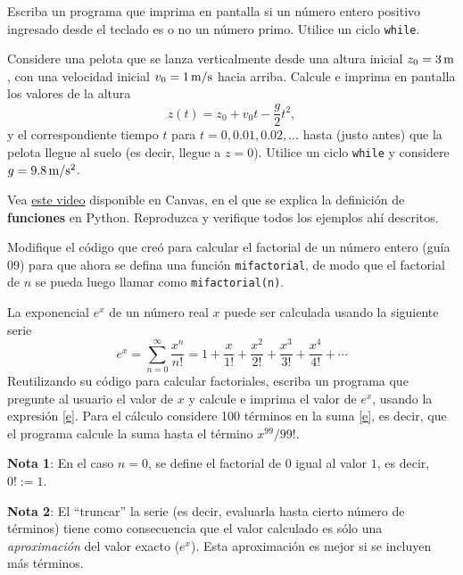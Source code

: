 \documentclass[11pt]{exam}
\begin{document}
\begin{questions}
\item Escriba un programa que imprima en pantalla si un número entero positivo ingresado desde el teclado es o no un número primo. Utilice un ciclo \texttt{while}.

\item Considere una pelota que se lanza verticalmente desde una altura inicial $z_0=3\,\rm m$, con una velocidad inicial $v_0 = 1 \,\rm m/s$ hacia arriba. Calcule e imprima en pantalla los valores de la altura
\begin{equation}
 z(t) = z_0 + v_0 t -\frac{g}{2}t^2,
\end{equation} 
y el correspondiente tiempo $t$ para $t=0,0.01,0.02,\dots$ hasta (justo antes) que la pelota llegue al suelo (es decir, llegue a $z=0$). Utilice un ciclo \texttt{while} y considere $g=9.8\,\rm m/s^2$.

\item Vea \href{https://udec.instructure.com/courses/51022/pages/funciones?module_item_id=1904636}{este video} disponible en Canvas, en el que se explica la definición de \textbf{funciones} en Python. Reproduzca y verifique todos los ejemplos ahí descritos.

\item Modifique el código que creó para calcular el factorial de un número entero (guía 09) para que ahora se defina una función \texttt{mifactorial}, de modo que el factorial de $n$ se pueda luego llamar como \texttt{mifactorial(n)}.

\item La exponencial $e^x$ de un número real $x$ puede ser calculada usando la siguiente serie
\begin{equation}\label{e}
e^x = \sum_{n=0}^\infty \frac{x^n}{n!}=1 + \frac{x}{1!} + \frac{x^2}{2!} + \frac{x^3}{3!} + \frac{x^4}{4!} + \cdots
\end{equation}
Reutilizando su código para calcular factoriales, escriba un programa que pregunte al usuario el valor de $x$ y calcule e imprima el valor de $e^x$, usando la expresión \eqref{e}. Para el cálculo considere 100 términos en la suma \eqref{e}, es decir, que el programa calcule la suma hasta el término $x^{99}/{99!}$. 

\textbf{Nota 1}: En el caso $n=0$, se define el factorial de $0$ igual al valor $1$, es decir, $0! :=1$.

\textbf{Nota 2}: El ``truncar'' la serie (es decir, evaluarla hasta cierto número de términos) tiene como consecuencia que el valor calculado es sólo una \textit{aproximación} del valor exacto ($e^x$). Esta aproximación es mejor si se incluyen más términos.


\end{questions}
\end{document}
